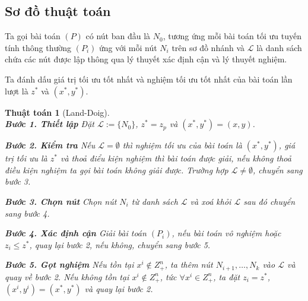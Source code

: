 \documentclass[12pt,a4paper]{report}
\newtheorem{ttoan}{Thuật toán}
\begin{document}
\subsection*{Sơ đồ thuật toán}
Ta gọi bài toán $(P)$ có nút ban đầu là $N_0$, tương ứng mỗi bài toán tối ưu tuyến tính thông thường $(P_i)$ ứng với mỗi nút $N_i$ trên sơ đồ nhánh và $\mathcal{L}$ là danh sách chứa các nút được lập thông qua lý thuyết xác định cận và lý thuyết nghiệm.

Ta đánh dấu giá trị tối ưu tốt nhất và nghiệm tối ưu tốt nhất của bài toán lần lượt là $z^*$ và $(x^*,y^*)$.

\begin{ttoan}[Land-Doig]
\setlength{\parindent}{4em}
\noindent \\
\noindent \textbf{Bước 1. Thiết lập}
Đặt $\mathcal{L}:=\{N_0 \}$, $z^*=z_p$ và $(x^*,y^*)=(x,y)$. 

\noindent \textbf{Bước 2. Kiểm tra} 
Nếu $\mathcal{L} = \emptyset$ thì nghiệm tối ưu của bài toán là $(x^*,y^*)$, giá trị  tối ưu là $z^*$ và thoả điểu kiện nghiệm thì bài toán được giải, nếu không thoả điều kiện nghiệm ta gọi bài toán không giải được. 
Trường hợp $\mathcal{L} \neq \emptyset$, chuyển sang bước 3.

\noindent \textbf{Bước 3. Chọn nút} 
Chọn nút $N_i$ từ danh sách $\mathcal{L}$ và xoá khỏi $\mathcal{L}$ sau đó chuyển sang  bước 4. 

\noindent \textbf{Bước 4. Xác định cận}  
Giải bài toán $(P_i)$, nếu bài toán vô nghiệm hoặc $z_i \leq z^*$, quay  lại bước 2, nếu không, chuyển sang bước 5.

\noindent \textbf{Bước 5. Gọt nghiệm} 
Nếu tồn tại $x^i \notin Z^n_+$, ta thêm nút $N_{i+1}, \ldots , N_{k}$ vào $\mathcal{L}$ và quay  về bước 2. 
Nếu không tồn tại $x^i \notin Z^n_+$, tức $\forall x^i \in Z^n_+$, ta đặt $z_i = z^*$,  $(x^i,y^i) = (x^*,y^*)$ và quay lại bước 2.
\end{ttoan}
\end{document}
